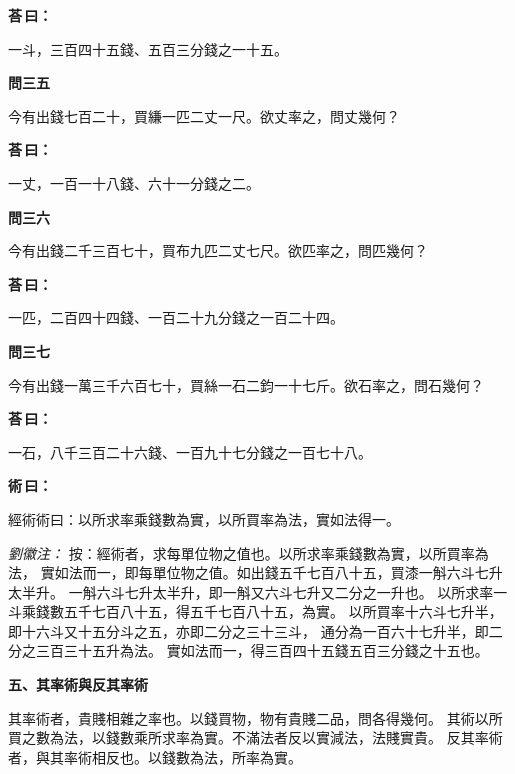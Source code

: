 \documentclass[11pt,a4paper]{article}
\newenvironment{problem}[1][]{%
  \par\vspace{0.6em}\noindent\textcolor{problemcolor}{\textbf{問\ignorespaces#1\unskip}\hspace{0.5em}}%
  \ignorespaces
}{\par\vspace{0.4em}}
\newenvironment{answer}{%
  \par\noindent\textcolor{answercolor}{\textbf{荅\,曰：}}%
  \ignorespaces
}{\par\vspace{0.3em}}
\newenvironment{method}{%
  \par\noindent\textcolor{methodcolor}{\textbf{術\,曰：}}%
  \ignorespaces
}{\par\vspace{0.4em}}
\newenvironment{liuhuicomm}{%
  \par\vspace{0.3em}\noindent\textcolor{commentarycolor}{\small\textit{劉徽注：}}}%
  {\par\vspace{0.5em}}
\begin{document}
\begin{answer}
一斗，三百四十五錢、五百三分錢之一十五。
\end{answer}

\begin{problem}[三五]
今有出錢七百二十，買縑一匹二丈一尺。欲丈率之，問丈幾何？
\end{problem}

\begin{answer}
一丈，一百一十八錢、六十一分錢之二。
\end{answer}

\begin{problem}[三六]
今有出錢二千三百七十，買布九匹二丈七尺。欲匹率之，問匹幾何？
\end{problem}

\begin{answer}
一匹，二百四十四錢、一百二十九分錢之一百二十四。
\end{answer}

\begin{problem}[三七]
今有出錢一萬三千六百七十，買絲一石二鈞一十七斤。欲石率之，問石幾何？
\end{problem}

\begin{answer}
一石，八千三百二十六錢、一百九十七分錢之一百七十八。
\end{answer}

\begin{method}
經術術曰：以所求率乘錢數為實，以所買率為法，實如法得一。
\end{method}

\begin{liuhuicomm}
按：經術者，求每單位物之值也。以所求率乘錢數為實，以所買率為法，
實如法而一，即每單位物之值。如出錢五千七百八十五，買漆一斛六斗七升太半升。
一斛六斗七升太半升，即一斛又六斗七升又二分之一升也。
以所求率一斗乘錢數五千七百八十五，得五千七百八十五，為實。
以所買率十六斗七升半，即十六斗又十五分斗之五，亦即二分之三十三斗，
通分為一百六十七升半，即二分之三百三十五升為法。
實如法而一，得三百四十五錢五百三分錢之十五也。
\end{liuhuicomm}

\vspace{0.8em}
\noindent\textbf{\large 五、其率術與反其率術}
\vspace{0.5em}

\noindent 其率術者，貴賤相雜之率也。以錢買物，物有貴賤二品，問各得幾何。
其術以所買之數為法，以錢數乘所求率為實。不滿法者反以實減法，法賤實貴。
反其率術者，與其率術相反也。以錢數為法，所率為實。
\end{document}
